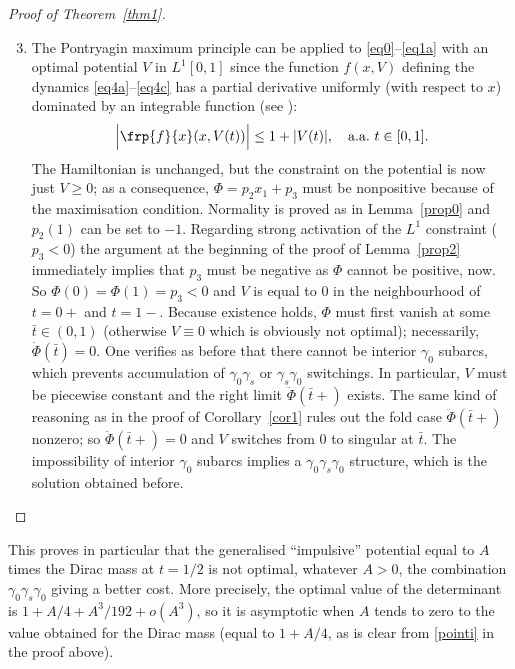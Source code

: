 \begin{proof}[Proof of Theorem~\ref{thm1}]
\begin{enumerate}\setcounter{enumi}{2}
\item\label{pointiii}
The Pontryagin maximum principle can be applied to \eqref{eq0}--\eqref{eq1a}
with an optimal potential $V$ in $L^1[0,1]$ since the function $f(x,V)$
defining the dynamics
\eqref{eq4a}--\eqref{eq4c} has a partial derivative uniformly (with respect to $x$) dominated by
an integrable function (see \cite[\S 4.2.C, Rem.\,5]{cesari-1983a}):
\[
\Bigl|\frp{f}{x}(x,V(t))\Bigr| \leq 1+|V(t)|,\quad \text{a.a.\ }t \in [0,1].
\]
The Hamiltonian is unchanged, but the constraint on the potential is now just $V \geq 0$;
as a consequence, $\Phi=p_2x_1+p_3$ must be nonpositive because of the maximisation
condition. Normality is proved as in Lemma~\ref{prop0} and $p_2(1)$ can be set to $-1$.
Regarding strong activation of the $L^1$ constraint ($p_3<0$) the argument at the
beginning of the proof of Lemma~\ref{prop2} immediately implies that $p_3$ must be
negative as $\Phi$ cannot be positive, now. So $\Phi(0)=\Phi(1)=p_3<0$ and $V$ is
equal to $0$ in the neighbourhood of $t=0+$ and $t=1-$. Because existence holds,
$\Phi$ must first vanish at some $\bar{t} \in (0,1)$ (otherwise $V \equiv 0$ which is
obviously not optimal); necessarily, $\dot{\Phi}(\bar{t})=0$. One verifies as before
that there cannot be interior $\gamma_0$ subarcs, which prevents accumulation of
$\gamma_0\gamma_s$ or $\gamma_s\gamma_0$ switchings. In particular, $V$ must be piecewise
constant and the right limit $\ddot{\Phi}(\bar{t}+)$ exists. The same kind of reasoning
as in the proof of Corollary~\ref{cor1} rules out the fold case $\ddot{\Phi}(\bar{t}+)$
nonzero; so $\ddot{\Phi}(\bar{t}+)=0$ and $V$ switches from $0$ to singular at
$\bar{t}$. The impossibility of interior $\gamma_0$ subarcs implies a
$\gamma_0\gamma_s\gamma_0$ structure, which is the solution obtained before.\qedhere
\end{enumerate}
\end{proof}

\begin{remark}
This proves in particular that the generalised
``impulsive'' potential equal to $A$ times the
Dirac mass at $t=1/2$ is not optimal, whatever $A>0$,
the combination $\gamma_0\gamma_s\gamma_0$ giving a better cost.
More precisely, the optimal value of the determinant is $1+A/4+A^3/192+o(A^3)$,
so it is asymptotic when $A$ tends to zero to the value obtained for the Dirac mass
(equal to $1+A/4$, as is clear from \eqref{pointi} in the proof above).
\end{remark}

